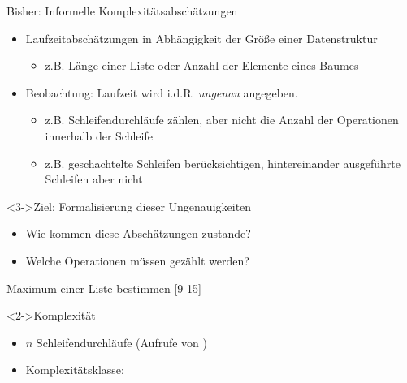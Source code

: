\begin{frame}
    \begin{block}{Bisher: Informelle Komplexitätsabschätzungen}
        \begin{itemize}
            \item Laufzeitabschätzungen in Abhängigkeit der Größe einer Datenstruktur
            \begin{itemize}
                \item z.B. Länge einer Liste oder Anzahl der Elemente eines Baumes
            \end{itemize}
            \item<2-> Beobachtung: Laufzeit wird i.d.R. \emph{ungenau} angegeben.
            \begin{itemize}
                \item z.B. Schleifendurchläufe zählen, aber nicht die Anzahl der Operationen innerhalb der Schleife
                \item z.B. geschachtelte Schleifen berücksichtigen, hintereinander ausgeführte Schleifen aber nicht
            \end{itemize}
        \end{itemize}
    \end{block}

    \begin{block}<3->{Ziel: Formalisierung dieser Ungenauigkeiten}
        \begin{itemize}
            \item Wie kommen diese Abschätzungen zustande?
            \item Welche Operationen müssen gezählt werden?
        \end{itemize}
    \end{block}
\end{frame}

\begin{frame}
    \begin{exblock}{Maximum einer Liste bestimmen}
        [9-15]
    \end{exblock}
    \begin{block}<2->{Komplexität}
        \begin{itemize}
            \item $n$ Schleifendurchläufe (Aufrufe von )
            \item Komplexitätsklasse: \olin
        \end{itemize}
    \end{block}
\end{frame}

